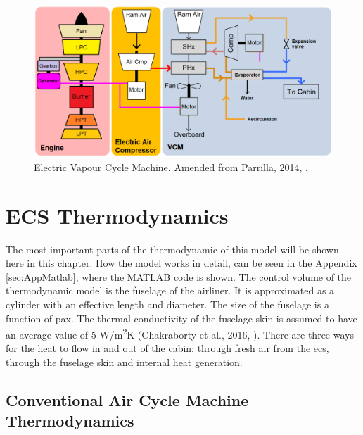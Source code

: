 \documentclass[english]{kththesis}
\begin{document}
\begin{figure}[!ht]
    \centering
    \includegraphics[width=1\textwidth]{Epictures/All Electric VCM ECS.png}
    \caption{Electric Vapour Cycle Machine. Amended from Parrilla, 2014, \cite{Parrilla2014}.}
    \label{fig:E-VCM}
\end{figure}

\section{ECS Thermodynamics}
\label{sec:ECSthermodynamics}


The most important parts of the thermodynamic of this model will be shown here in this chapter. How the model works in detail, can be seen in the Appendix \ref{sec:AppMatlab}, where the MATLAB code is shown.
The control volume of the thermodynamic model is the fuselage of the airliner. It is approximated as a cylinder with an effective length and diameter. The size of the fuselage is a function of pax. The thermal conductivity of the fuselage skin is assumed to have an average value of 5 W/m\textsuperscript{2}K (Chakraborty et al., 2016, \cite{Chakraborty2016}). There are three ways for the heat to flow in and out of the cabin: through fresh air from the \acrshort{ecs}, through the fuselage skin and internal heat generation.


\subsection{Conventional Air Cycle Machine Thermodynamics}
\label{subsec:ConvACMThermodynamics}
\end{document}
